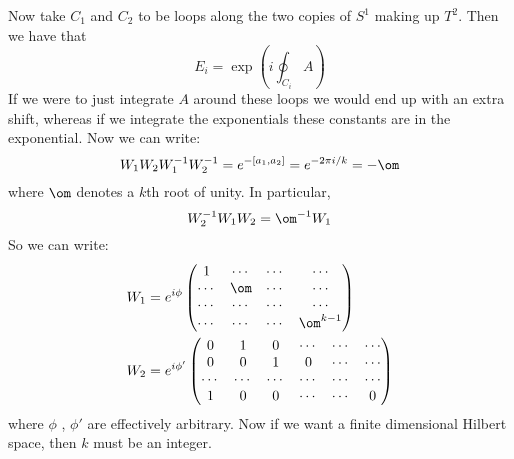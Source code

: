 \documentclass{booc}
\begin{document}
Now take $C_1$ and $C_2$ to be loops along the two copies of $S^1$ making up
$T^2$. Then we have that
\begin{equation}
E_i = \exp\left( i\oint_{C_i} A \right)
\end{equation}
If we were to just integrate $A$ around these loops we would end up with
an extra shift, whereas if we integrate the exponentials these constants are in the exponential.
Now we can write:
\begin{equation}
W_1 W_2 W_1^{-1} W_2^{-1} = e^{-\left[ a_1 , a_2 \right]} = e^{-2\pi i /k} = -\om
\end{equation}
where $\om$ denotes a $k$th root of unity.
In particular, 
\begin{equation}
W_2^{-1} W_1 W_2= \om^{-1}W_1
\end{equation}
So we can write:
\begin{align}
W_1 &= e^{i\phi}
\begin{pmatrix}
1& \cdots & \cdots & \cdots \\
\cdots & \om & \cdots & \cdots \\
\cdots & \cdots & \cdots & \cdots \\
\cdots & \cdots & \cdots & \om^{k-1}
\end{pmatrix}
\\
W_2 &= e^{i\phi'}
\begin{pmatrix}
0 & 1 & 0 & \cdots & \cdots & \cdots \\
0 & 0 & 1 & 0      & \cdots & \cdots \\
\cdots & \cdots & \cdots & \cdots & \cdots & \cdots \\
1 & 0 & 0 & \cdots & \cdots & 0
\end{pmatrix}
\end{align}
where $\phi$ , $\phi'$ are effectively arbitrary. 
Now if we want a finite dimensional Hilbert space, then $k$ must be an integer. 
\end{document}
